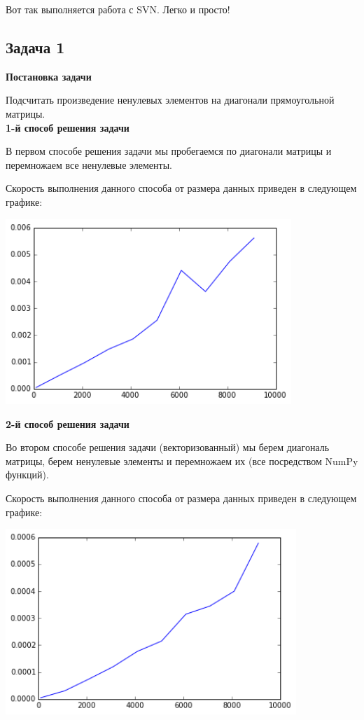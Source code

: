 \documentclass[12pt, a4paper]{article}
\begin{document}
			Вот так выполняется работа с SVN. Легко и просто!



		\newpage
		\subsection{Задача 1}

			{\bf Постановка задачи\\}

				Подсчитать произведение ненулевых элементов на диагонали прямоугольной матрицы. \\

				{\bf 1-й способ решения задачи\\}

				В первом способе решения задачи мы пробегаемся по диагонали матрицы и перемножаем все ненулевые элементы.

				Скорость выполнения данного способа от размера данных приведен в следующем графике:
				\begin{center}
					\includegraphics[height=7cm]{timeit/num1_ti1.png}
				\end{center}


			{\bf 2-й способ решения задачи\\}

				Во втором способе решения задачи (векторизованный) мы берем диагональ матрицы, берем ненулевые элементы и перемножаем их (все посредством NumPy функций).

				Скорость выполнения данного способа от размера данных приведен в следующем графике:
				\begin{center}
					\includegraphics[height=7cm]{timeit/num1_ti2.png}
				\end{center}
\end{document}
